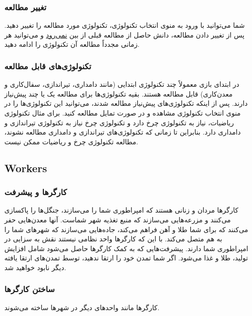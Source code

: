 \documentclass[]{article}
\begin{document}
\subsubsection*{{\titr تغییر مطالعه}}
شما می‌توانید با ورود به منوی انتخاب تکنولوژی، تکنولوژی مورد مطالعه را تغییر دهید. پس از تغییر دادن مطالعه، دانش حاصل از مطالعه قبلی از بین \underline{نمی‌رود} و می‌توانید هر زمانی مجدداً مطالعه آن تکنولوژی را ادامه دهید.

\subsubsection*{{\titr تکنولوژی‌های قابل مطالعه}}
در ابتدای بازی معمولاً چند تکنولوژی ابتدایی (مانند دامداری، تیراندازی، سفال‌کاری و معدن‌کاری) قابل مطالعه هستند. بقیه تکنولوژی‌ها برای مطالعه یک یا چند پیش‌نیاز دارند. پس از اینکه تکنولوژی‌های پیش‌نیاز مطالعه شدند، می‌توانید این تکنولوژی‌ها را در منوی انتخاب تکنولوژی مشاهده و در صورت تمایل مطالعه کنید. برای مثال تکنولوژی ریاضیات، نیاز به تکنولوژی چرخ دارد و تکنولوژی چرخ نیاز به تکنولوژی تیراندازی و دامداری دارد. بنابراین تا زمانی که تکنولوژی‌های تیراندازی و دامداری مطالعه نشوند، مطالعه تکنولوژی چرخ و ریاضیات ممکن نیست.



\subsection*{{\titr Workers}}


\subsubsection*{{\titr کارگرها و پیشرفت}}
کارگرها مردان و زنانی هستند که امپراطوری شما را می‌سازند، جنگل‌ها را پاکسازی می‌کنند و مزرعه‌هایی می‌سازند که منبع تغذیه شهر شماست.
آنها معدن‌هایی حفر می‌کنند که برای شما طلا و آهن فراهم می‌کند، جاده‌‌هایی می‌سازند که شهرهای شما را به هم متصل می‌کند.
با این که کارگرها واحد نظامی نیستند نقش به سزایی در امپراطوری شما دارند.
پیشرفت‌هایی که به کمک کارگرها حاصل می‌شود شامل افزایش تولید، طلا و غذا می‌شود. اگر شما تمدن خود را ارتقا ندهید، توسط تمدن‌های ارتقا یافته دیگر نابود خواهید شد.

\subsubsection*{{\titr ساختن کارگرها}}
کارگرها مانند واحدهای دیگر در شهرها ساخته می‌شوند.
\end{document}
